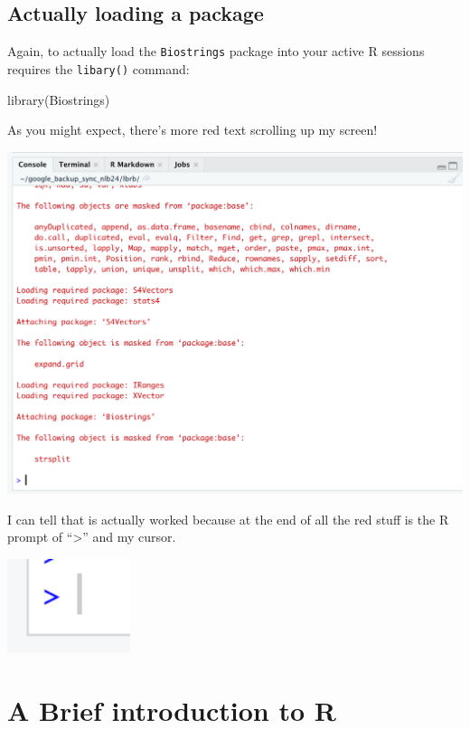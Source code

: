 \documentclass[
]{book}
\newenvironment{Shaded}{\begin{snugshade}}{\end{snugshade}}
\newcommand{\FunctionTok}[1]{\textcolor[rgb]{0.00,0.00,0.00}{#1}}
\newcommand{\NormalTok}[1]{#1}
\begin{document}
\hypertarget{actually-loading-a-package}{%
\section{Actually loading a package}\label{actually-loading-a-package}}

Again, to actually load the \texttt{Biostrings} package into your active R sessions requires the \texttt{libary()} command:

\begin{Shaded}
\begin{Highlighting}[]
\FunctionTok{library}\NormalTok{(Biostrings)}
\end{Highlighting}
\end{Shaded}

As you might expect, there's more red text scrolling up my screen!

\includegraphics[width=20.36in]{images/angry_red_text_library_biostrings}

I can tell that is actually worked because at the end of all the red stuff is the R prompt of ``\textgreater{}'' and my cursor.

\includegraphics[width=1.42in]{images/R_cursor}

\hypertarget{a-brief-introduction-to-r}{%
\chapter{A Brief introduction to R}\label{a-brief-introduction-to-r}}
\end{document}
